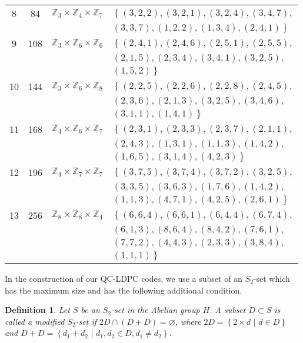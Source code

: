\documentclass[journal,draftclsnofoot,onecolumn,12pt,twoside]{IEEEtran}
\newtheorem{Definition}{Definition}
\begin{document}
\begin{table}[ht]
\begin{tabular}{c|c|l|l}
 8 & 84 & $\mathbb{Z}_3\times \mathbb{Z}_4\times \mathbb{Z}_7$ & $\left\lbrace (3, 2, 2), (3, 2, 1), (3, 2, 4), (3, 4, 7), \right.$\\
 & & & $\left. (3, 3, 7), (1, 2, 2), (1, 3, 4),(2,4,1)\right\rbrace$ \\
 9 & 108 & $\mathbb{Z}_3\times\mathbb{Z}_6\times  \mathbb{Z}_{6}$ & $\left\lbrace (2, 4, 1), (2,4,6), (2,5,1), (2,5,5), \right.$ \\
& & & $ (2,1,5), (2,3,4), (3,4,1), (3,2,5), $ \\
& & & $\left.(1,5,2)\right\rbrace$\\
 10 & 144 & $\mathbb{Z}_3\times\mathbb{Z}_6\times  \mathbb{Z}_{8}$ & $\left\lbrace (2, 2, 5), (2,2,6), (2,2,8), (2,4,5), \right.$ \\
& & & $ (2,3,6), (2,1,3), (3,2,5), (3,4,6), $ \\
& & & $\left.(3,1,1),(1,4,1)\right\rbrace$\\
 11 & 168 & $\mathbb{Z}_4\times\mathbb{Z}_6\times  \mathbb{Z}_{7}$ & $\left\lbrace (2, 3, 1), (2,3,3), (2,3,7), (2,1,1), \right.$ \\
& & & $ (2,4,3), (1,3,1), (1,1,3), (1,4,2), $ \\
& & & $\left.(1,6,5),(3,1,4),(4,2,3)\right\rbrace$\\
 12 & 196 & $\mathbb{Z}_4\times\mathbb{Z}_7\times  \mathbb{Z}_{7}$ & $\left\lbrace (3, 7, 5), (3,7,4), (3,7,2), (3,2,5), \right.$ \\
& & & $ (3,3,5), (3,6,3), (1,7,6), (1,4,2), $ \\
& & & $\left.(1,1,3),(4,7,1),(4,2,5),(2,6,1)\right\rbrace$\\
13  & 256 & $\mathbb{Z}_8\times \mathbb{Z}_8\times \mathbb{Z}_4$ & $ \left\lbrace (6,6,4), (6,6,1), (6,4,4), (6,7,4), \right.$\\
& & & $  (6,1,3),(8,6,4), (8,4,2), (7,6,1), $\\
 & & & $ (7,7,2), (4,4,3),(2,3,3), (3,8,4), $ \\
 & & & $\left. (1,1,1) \right\rbrace$\\
\hline
 \end{tabular}
 \label{table4}
 \end{table}


In the construction of our QC-LDPC codes, we use a subset of an $S_2$-set which has the maximum size and has the following additional condition.
\begin{Definition}
Let $S$ be an $S_2$-set in the Abelian group $H$. A subset $D\subset S$ is called a \emph{modified $S_2$-set} if $2D\cap (D+D)=\varnothing$, where $2D=\left\{2\times d\,\,|\,\, d\in D\right\}$ and $D+D=\left\{d_1+d_2\,\,|\,\,d_1,d_2\in D, d_1\neq d_2\right\}$.
\end{Definition}
\end{document}
